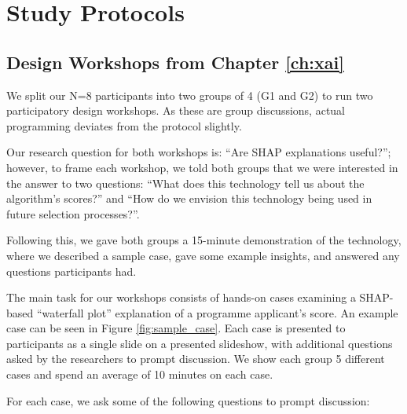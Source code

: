 

\chapter{\label{app:protocolmockup}Study Protocols}

\minitoc

\section{Design Workshops from Chapter \ref{ch:xai}}\label{app:xaiprotocol}
We split our N=8 participants into two groups of 4 (G1 and G2) to run two participatory design workshops. As these are group discussions, actual programming deviates from the protocol slightly.

Our research question for both workshops is: ``Are SHAP explanations useful?''; however, to frame each workshop, we told both groups that we were interested in the answer to two questions: ``What does this technology tell us about the algorithm’s scores?'' and ``How do we envision this technology being used in future selection processes?''.

Following this, we gave both groups a 15-minute demonstration of the technology, where we described a sample case, gave some example insights, and answered any questions participants had. 

The main task for our workshops consists of hands-on cases examining a SHAP-based ``waterfall plot'' explanation of a programme applicant's score. An example case can be seen in Figure \ref{fig:sample_case}. Each case is presented to participants as a single slide on a presented slideshow, with additional questions asked by the researchers to prompt discussion. We show each group 5 different cases and spend an average of 10 minutes on each case.

For each case, we ask some of the following questions to prompt discussion:

